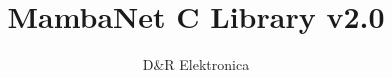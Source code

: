 \documentclass[a4paper]{report}
\begin{document}
\title{MambaNet C Library v2.0}
\author{D\&R Elektronica}
\maketitle

\setcounter{tocdepth}{1}
\tableofcontents
\setcounter{tocdepth}{2}





\end{document}
